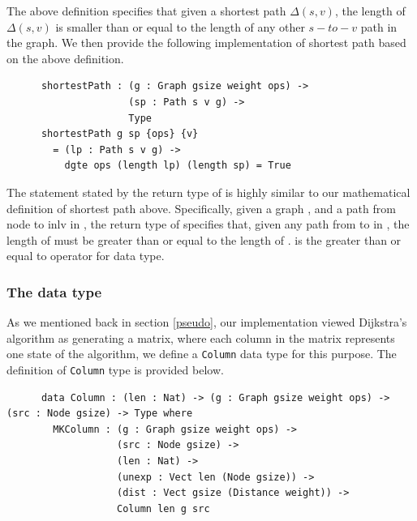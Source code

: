 The above definition specifies that given a shortest path $\Delta(s, v)$, the length of $\Delta(s, v)$ is smaller than or equal to the length of any other $s-to-v$ path in the graph. We then provide the following implementation of shortest path based on the above definition. 

\begin{lstlisting}
      shortestPath : (g : Graph gsize weight ops) ->
                     (sp : Path s v g) ->
                     Type
      shortestPath g sp {ops} {v}
        = (lp : Path s v g) ->
          dgte ops (length lp) (length sp) = True
\end{lstlisting}

The statement stated by the return type of  is highly similar to our mathematical definition of shortest path above. Specifically, given a graph , and a path  from node  to inl{v} in , the return type of  specifies that, given any path  from  to  in , the length of  must be greater than or equal to the length of .  is the greater than or equal to operator for  data type. 
\\

\subsubsection{The  data type} \label{column}
As we mentioned back in section \ref{pseudo}, our implementation viewed Dijkstra's algorithm as generating a matrix, where each column in the matrix represents one state of the algorithm, we define a \texttt{Column} data type for this purpose. The definition of \texttt{Column} type is provided below. 

\begin{lstlisting}
      data Column : (len : Nat) -> (g : Graph gsize weight ops) -> (src : Node gsize) -> Type where
        MKColumn : (g : Graph gsize weight ops) ->
                   (src : Node gsize) ->
                   (len : Nat) ->
                   (unexp : Vect len (Node gsize)) ->
                   (dist : Vect gsize (Distance weight)) ->
                   Column len g src

\end{lstlisting}

